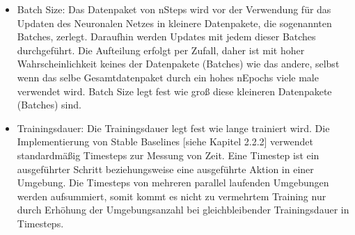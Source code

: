 \begin{itemize}
\item Batch Size: Das Datenpaket von nSteps wird vor der Verwendung für das Updaten des Neuronalen Netzes in kleinere Datenpakete, die sogenannten Batches, zerlegt. Daraufhin werden Updates mit jedem dieser Batches durchgeführt. Die Aufteilung erfolgt per Zufall, daher ist mit hoher Wahrscheinlichkeit keines der Datenpakete (Batches) wie das andere, selbst wenn das selbe Gesamtdatenpaket durch ein hohes nEpochs viele male verwendet wird. Batch Size legt fest wie groß diese kleineren Datenpakete (Batches) sind.

\item 
Trainingsdauer: Die Trainingsdauer legt fest wie lange trainiert wird. Die Implementierung von Stable Baselines [siehe Kapitel 2.2.2] verwendet standardmäßig Timesteps zur Messung von Zeit. Eine Timestep ist ein ausgeführter Schritt beziehungsweise eine ausgeführte Aktion in einer Umgebung. Die Timesteps von mehreren parallel laufenden Umgebungen werden aufsummiert, somit kommt es nicht zu vermehrtem Training nur durch Erhöhung der Umgebungsanzahl bei gleichbleibender Trainingsdauer in Timesteps.
\end{itemize}
